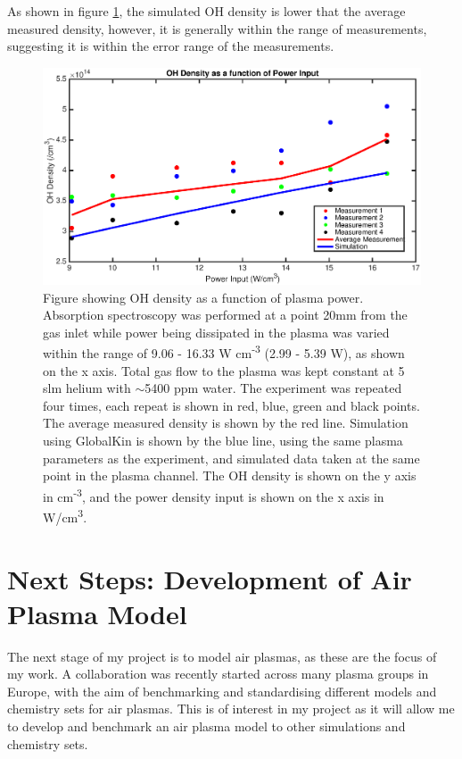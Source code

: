 \documentclass[11pt, oneside]{article}   	%
\begin{document}
As shown in figure \ref{PowerVariation}, the simulated OH density is lower that the average measured density, however, it is generally within the range of measurements, suggesting it is within the error range of the measurements.

\begin{figure}
\includegraphics[width=\textwidth]{Figures/PowerVariation}
\caption{Figure showing OH density as a function of plasma power. Absorption spectroscopy was performed at a point 20mm from the gas inlet while power being dissipated in the plasma was varied within the range of 9.06 - 16.33 W cm\textsuperscript{-3} (2.99 - 5.39 W), as shown on the x axis. Total gas flow to the plasma was kept constant at 5 slm helium with $\sim$5400 ppm water. The experiment was repeated four times, each repeat is shown in red, blue, green and black points. The average measured density is shown by the red line.
Simulation using GlobalKin is shown by the blue line, using the same plasma parameters as the experiment, and simulated data taken at the same point in the plasma channel.
The OH density is shown on the y axis in cm\textsuperscript{-3}, and the power density input is shown on the x axis in W/cm\textsuperscript{3}.}
\label{PowerVariation}
\end{figure}


\section{Next Steps: Development of Air Plasma Model}

The next stage of my project is to model air plasmas, as these are the focus of my work.
A collaboration was recently started across many plasma groups in Europe, with the aim of benchmarking and standardising different models and chemistry sets for air plasmas.
This is of interest in my project as it will allow me to develop and benchmark an air plasma model to other simulations and chemistry sets.
\end{document}
